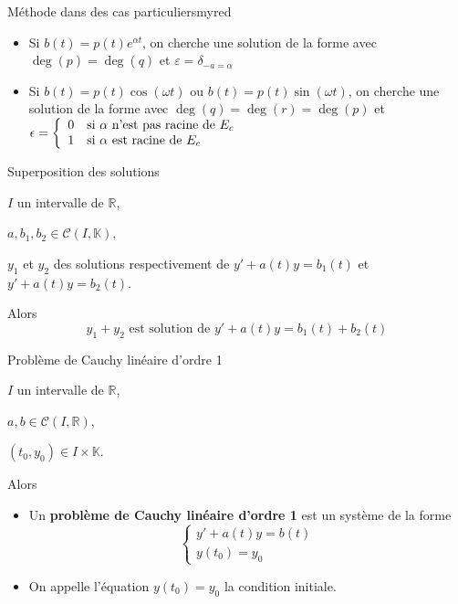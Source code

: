     \begin{omed}{Méthode dans des cas particuliers}{myred}
        \begin{itemize}
            \item Si \textcolor{myred}{$b(t) = p(t)e^{\alpha t}$}, on cherche une solution de la forme  avec $\deg(p) = \deg(q)$ et $\varepsilon = \delta_{-a = \alpha}$
            \item Si \textcolor{myred}{$b(t) = p(t)\cos(\omega t)$} ou \textcolor{myred}{$b(t) = p(t)\sin(\omega t)$}, on cherche une solution de la forme  avec $\deg(q) = \deg(r) = \deg(p)$ et $\epsilon = \sisi{0}{\alpha \text{ n’est pas racine de } E_c}{1}{\alpha \text{ est racine de } E_c}$
        \end{itemize}
    \end{omed}

    \begin{theo}{Superposition des solutions}{}
        \begin{soient}
            \item $I$ un intervalle de $\mathbb{R}$,
            \item $a,b_1,b_2 \in \mathcal{C}(I,\mathbb{K})$,
            \item $y_1$ et $y_2$ des solutions respectivement de $y' + a(t)y = b_1(t)$ et $y' + a(t)y = b_2(t)$.
        \end{soient}
        Alors 
        \[ y_1 + y_2 \text{ est solution de } y' + a(t)y = b_1(t) + b_2(t) \]
    \end{theo}

    \begin{defi}{Problème de Cauchy linéaire d’ordre 1}{}
        \begin{soient}
            \item $I$ un intervalle de $\mathbb{R}$,
            \item $a,b \in \mathcal{C}(I,\mathbb{R})$,
            \item $(t_0,y_0) \in I \times \mathbb{K}$.
        \end{soient}
        Alors
        \begin{itemize}
            \item Un \textbf{problème de Cauchy linéaire d’ordre 1} est un système de la forme \[ \left\{ \begin{array}{l}
                y' + a(t)y = b(t)\\
                y(t_0) = y_0
                \end{array} \right. \]
            \item On appelle l’équation $y(t_0) = y_0$ la condition initiale.
        \end{itemize}
    \end{defi}
    
